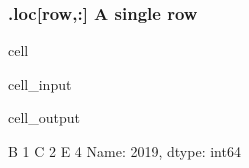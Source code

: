 \documentclass[letterpaper,10pt,english]{jupyterBook}
\begin{document}
\subsubsection{.loc{[}row,:{]} A single row}
\label{\detokenize{content/notebooks/pandas/dataframes:loc-row-a-single-row}}
\begin{sphinxuseclass}{cell}\begin{sphinxVerbatimInput}

\begin{sphinxuseclass}{cell_input}
\begin{sphinxVerbatim}[commandchars=\\\{\}]
\PYG{p}{[}\PYG{p}{]}
\end{sphinxVerbatim}

\end{sphinxuseclass}\end{sphinxVerbatimInput}
\begin{sphinxVerbatimOutput}

\begin{sphinxuseclass}{cell_output}
\begin{sphinxVerbatim}[commandchars=\\\{\}]
B    1
C    2
E    4
Name: 2019, dtype: int64
\end{sphinxVerbatim}

\end{sphinxuseclass}\end{sphinxVerbatimOutput}

\end{sphinxuseclass}
\end{document}

